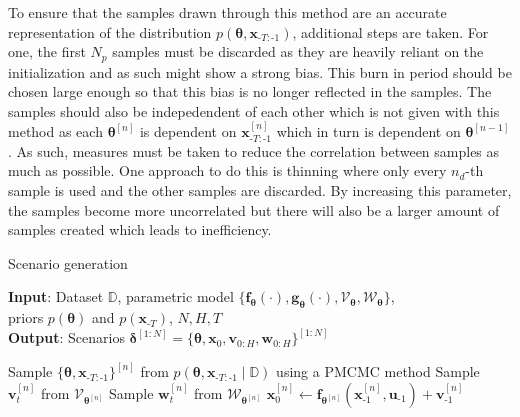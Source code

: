 To ensure that the samples drawn through this method are an accurate representation of the distribution  $p(\boldsymbol{\theta}, \boldsymbol{x}_{\text{-}T:\text{-}1})$, additional steps are taken. For one, the first $N_p$ samples must be discarded as they are heavily reliant on the initialization and as such might show a strong bias. This burn in period should be chosen large enough so that this bias is no longer reflected in the samples. The samples should also be indepedendent of each other which is not given with this method as each $\boldsymbol{\theta}^{[n]}$ is dependent on $\boldsymbol{x}_{\text{-}T:\text{-}1}^{[n]}$ which in turn is dependent on $\boldsymbol{\theta}^{[n-1]}$. As such, measures must be taken to reduce the correlation between samples as much as possible. One approach to do this is thinning where only every $n_d$-th sample is used and the other samples are discarded. By increasing this parameter, the samples become more uncorrelated but there will also be a larger amount of samples created which leads to inefficiency.

\begin{algorithm}
	\caption{Scenario generation}\label{alg:PGibbs}
	\hspace*{\algorithmicindent} \textbf{Input}: Dataset $\mathbb{D}$, parametric model $\{\boldsymbol{f}_{\boldsymbol{\theta}}(\cdot), \boldsymbol{g}_{\boldsymbol{\theta}}(\cdot), \boldsymbol{\mathcal{V}}_{\boldsymbol{\theta}}, \boldsymbol{\mathcal{W}}_{\boldsymbol{\theta}}\}$, \\
	\hspace*{\algorithmicindent} \hspace*{\algorithmicindent} priors $p(\boldsymbol{\theta})$ and $p(\boldsymbol{x}_{\text{-}T})$, $N, H, T$ \\
	\hspace*{\algorithmicindent} \textbf{Output}: Scenarios $ \boldsymbol{\delta}^{[1:N]} = \{ \boldsymbol{\theta}, \boldsymbol{x}_0, \boldsymbol{v}_{0:H}, \boldsymbol{w}_{0:H}\}^{[1:N]}$
	\begin{algorithmic}[1]
			\State Sample $\{ \boldsymbol{\theta}, \boldsymbol{x}_{\text{-}T:\text{-}1} \}^{[n]}$ from $p\left( \boldsymbol{\theta}, \boldsymbol{x}_{\text{-}T:\text{-}1} \mid \mathbb{D} \right)$ using a PMCMC method
				\State Sample $\boldsymbol{v}_t^{[n]}$ from $\boldsymbol{\mathcal{V}}_{\boldsymbol{\theta}^{[n]}}$
				\State Sample $\boldsymbol{w}_t^{[n]}$ from $\boldsymbol{\mathcal{W}}_{\boldsymbol{\theta}^{[n]}}$
			\EndFor
			\State $\boldsymbol{x}_0^{[n]} \gets \boldsymbol{f}_{\boldsymbol{\theta}^{[n]}} \left( \boldsymbol{x}_{\text{-} 1}^{[n]}, \boldsymbol{u}_{\text{-} 1} \right) + \boldsymbol{v}_{\text{-} 1}^{[n]}$
		\EndFor
	\end{algorithmic}
\end{algorithm}

